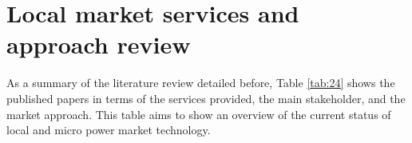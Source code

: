 \section{Local market services and approach review} \label{sec:servicesreview}
As a summary of the literature review detailed before, Table \ref{tab:24} shows the published papers in terms of the services provided, the main stakeholder, and the market approach. This table aims to show an overview of the current status of local and micro power market technology.
